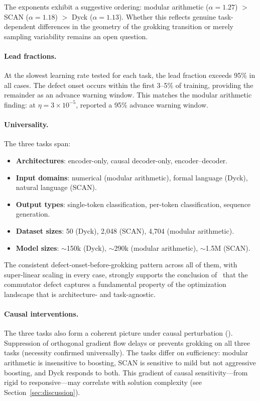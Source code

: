 \documentclass[11pt]{article}
\begin{document}
The exponents exhibit a suggestive ordering: modular arithmetic ($\alpha = 1.27$) $>$ SCAN ($\alpha = 1.18$) $>$ Dyck ($\alpha = 1.13$). Whether this reflects genuine task-dependent differences in the geometry of the grokking transition or merely sampling variability remains an open question.

\paragraph{Lead fractions.} At the slowest learning rate tested for each task, the lead fraction exceeds 95\% in all cases. The defect onset occurs within the first 3--5\% of training, providing the remainder as an advance warning window. This matches the modular arithmetic finding: at $\eta = 3 \times 10^{-5}$, \citet{xu2026integrability} reported a 95\% advance warning window.

\paragraph{Universality.} The three tasks span:
\begin{itemize}
  \item \textbf{Architectures}: encoder-only, causal decoder-only, encoder--decoder.
  \item \textbf{Input domains}: numerical (modular arithmetic), formal language (Dyck), natural language (SCAN).
  \item \textbf{Output types}: single-token classification, per-token classification, sequence generation.
  \item \textbf{Dataset sizes}: 50 (Dyck), 2,048 (SCAN), 4,704 (modular arithmetic).
  \item \textbf{Model sizes}: $\sim$150k (Dyck), $\sim$290k (modular arithmetic), $\sim$1.5M (SCAN).
\end{itemize}
The consistent defect-onset-before-grokking pattern across all of them, with super-linear scaling in every case, strongly supports the conclusion of~\citet{xu2026integrability} that the commutator defect captures a fundamental property of the optimization landscape that is architecture- and task-agnostic.

\paragraph{Causal interventions.} The three tasks also form a coherent picture under causal perturbation (). Suppression of orthogonal gradient flow delays or prevents grokking on all three tasks (necessity confirmed universally). The tasks differ on sufficiency: modular arithmetic is insensitive to boosting, SCAN is sensitive to mild but not aggressive boosting, and Dyck responds to both. This gradient of causal sensitivity---from rigid to responsive---may correlate with solution complexity (see Section~\ref{sec:discussion}).
\end{document}
